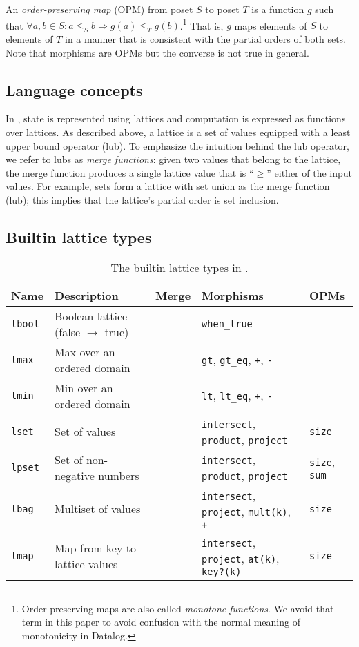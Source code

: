 An \emph{order-preserving map} (OPM) from poset $S$ to poset $T$ is a function
$g$ such that $\forall a,b \in S: a \leq_S b \Rightarrow g(a) \leq_T
g(b)$.\footnote{Order-preserving maps are also called \emph{monotone functions}.
  We avoid that term in this paper to avoid confusion with the normal meaning of
  monotonicity in Datalog.} That is, $g$ maps elements of $S$ to elements of $T$
in a manner that is consistent with the partial orders of both sets. Note that
morphisms are OPMs but the converse is not true in general.

\subsection{Language concepts}
In \lang, state is represented using lattices and computation is expressed as
functions over lattices. As described above, a lattice is a set of values
equipped with a least upper bound operator (lub). To emphasize the intuition
behind the lub operator, we refer to lubs as \emph{merge functions}: given two
values that belong to the lattice, the merge function produces a single lattice
value that is ``$\ge$'' either of the input values. For example, sets form a
lattice with set union as the merge function (lub); this implies that the
lattice's partial order is set inclusion.

\subsection{Builtin lattice types}
\label{sec:lattice-builtins}

\begin{table*}[t]
\begin{tabular}{|l|l|l|l|l|}
\hline
\textbf{Name} & \textbf{Description} & \textbf{Merge} & \textbf{Morphisms} & \textbf{OPMs}\\
\hline
\texttt{lbool} & Boolean lattice (false $\to$ true) & & \texttt{when\_true} & \\
\texttt{lmax} & Max over an ordered domain & &\texttt{gt},
\texttt{gt\_eq}, \texttt{+}, \texttt{-} & \\
\texttt{lmin} & Min over an ordered domain & &\texttt{lt}, \texttt{lt\_eq},
\texttt{+}, \texttt{-} & \\
\texttt{lset} & Set of values & & \texttt{intersect}, \texttt{product},
\texttt{project} & \texttt{size} \\
\texttt{lpset} & Set of non-negative numbers & &
\texttt{intersect}, \texttt{product}, \texttt{project}& \texttt{size}, \texttt{sum} \\
\texttt{lbag} & Multiset of values & & \texttt{intersect},
\texttt{project}, \texttt{mult(k)}, \texttt{+} & \texttt{size}\\
\texttt{lmap} & Map from key to lattice values & &
\texttt{intersect}, \texttt{project}, \texttt{at(k)}, \texttt{key?(k)} & \texttt{size}\\
\hline
\end{tabular}
\caption{The builtin lattice types in \lang.}
\label{tbl:builtin-lattices}
\end{table*}


